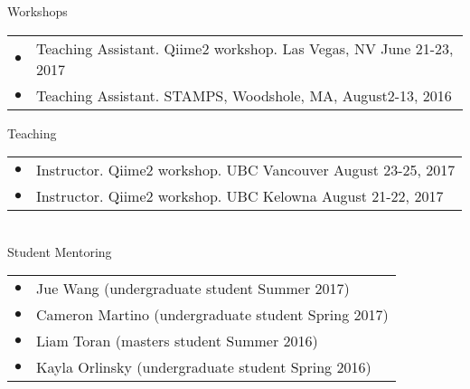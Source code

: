 \documentclass{resume} %
\begin{document}
\begin{rSection}{Workshops}
  \begin{tabular}{ll}
    $\bullet$ & Teaching Assistant. Qiime2 workshop. Las Vegas, NV June 21-23, 2017 \\
    $\bullet$ & Teaching Assistant. STAMPS, Woodshole, MA, August2-13, 2016 \\
  \end{tabular}
\end{rSection}

\begin{rSection}{Teaching}
  \begin{tabular}{ll}
    $\bullet$ & Instructor. Qiime2 workshop. UBC Vancouver August 23-25, 2017 \\
    $\bullet$ & Instructor. Qiime2 workshop. UBC Kelowna August 21-22, 2017 \\
  \end{tabular}\\[1 mm]
  Student Mentoring\\
  \begin{tabular}{ll}
    $\bullet$  &   Jue Wang (undergraduate student Summer 2017) \\
    $\bullet$  &   Cameron Martino (undergraduate student Spring 2017) \\
    $\bullet$  &   Liam Toran (masters student Summer 2016)\\
    $\bullet$  &   Kayla Orlinsky (undergraduate student Spring 2016) \\
  \end{tabular}
\end{rSection}
\end{document}
